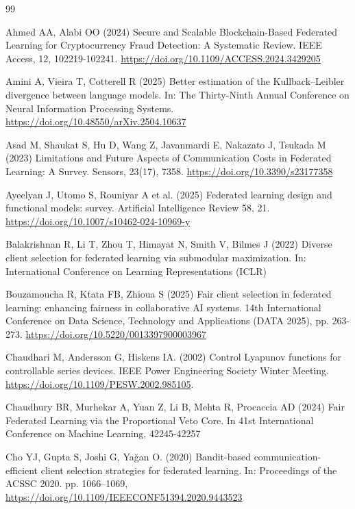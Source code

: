 \documentclass[pdflatex,sn-mathphys-num,oneside]{sn-jnl}%
\theoremstyle{thmstyleone}%
\theoremstyle{thmstyletwo}%
\theoremstyle{thmstylethree}%
\begin{document}
\begin{thebibliography}{99}
\setlength{\itemsep}{3pt}
\setlength{\parsep}{0pt}

Ahmed AA, Alabi OO (2024) Secure and Scalable Blockchain-Based Federated Learning for Cryptocurrency Fraud Detection: A Systematic Review. IEEE Access, 12, 102219-102241. \url{https://doi.org/10.1109/ACCESS.2024.3429205}

Amini A, Vieira T, Cotterell R (2025) Better estimation of the Kullback–Leibler divergence between language models. In: The Thirty-Ninth Annual Conference on Neural Information Processing Systems. \url{https://doi.org/10.48550/arXiv.2504.10637}

Asad M, Shaukat S, Hu D, Wang Z, Javanmardi E, Nakazato J, Tsukada M (2023) Limitations and Future Aspects of Communication Costs in Federated Learning: A Survey. Sensors, 23(17), 7358. \url{https://doi.org/10.3390/s23177358}

Ayeelyan J, Utomo S, Rouniyar A et al. (2025) Federated learning design and functional models: survey.  Artificial Intelligence Review 58, 21. \url{https://doi.org/10.1007/s10462-024-10969-y}

Balakrishnan R, Li T, Zhou T, Himayat N, Smith V, Bilmes J (2022) Diverse client selection for federated learning via submodular maximization. In: International Conference on Learning Representations (ICLR)

Bouzamoucha R, Ktata FB, Zhioua S (2025) Fair client selection in federated learning: enhancing fairness in collaborative AI systems. 14th International Conference on Data Science, Technology and Applications (DATA 2025), pp. 263-273. \url{https://doi.org/10.5220/0013397900003967}

Chaudhari M, Andersson G, Hiskens IA. (2002) Control Lyapunov functions for controllable series devices. IEEE Power Engineering Society Winter Meeting. \url{https://doi.org/10.1109/PESW.2002.985105}.

Chaudhury BR, Murhekar A, Yuan Z, Li B, Mehta R, Procaccia AD (2024) Fair Federated Learning via the Proportional Veto Core. In 41st International Conference on Machine Learning, 42245-42257

Cho YJ, Gupta S, Joshi G, Yağan O. (2020) Bandit-based communication-efficient client selection strategies for federated learning. In: Proceedings of the ACSSC 2020. pp. 1066–1069, \url{https://doi.org/10.1109/IEEECONF51394.2020.9443523}


\end{thebibliography}
\end{document}
